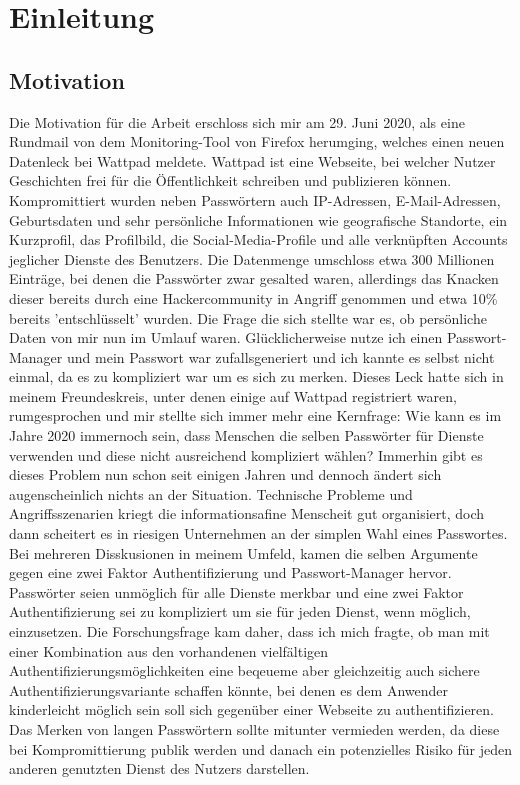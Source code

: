 \chapter{Einleitung}

\section{Motivation}
Die Motivation für die Arbeit erschloss sich mir am 29. Juni 2020, als eine Rundmail von dem Monitoring-Tool von Firefox herumging, welches einen neuen Datenleck bei Wattpad meldete. Wattpad ist eine Webseite, bei welcher Nutzer Geschichten frei für die Öffentlichkeit schreiben und publizieren können. Kompromittiert wurden neben Passwörtern auch IP-Adressen, E-Mail-Adressen, Geburtsdaten und sehr persönliche Informationen wie geografische Standorte, ein Kurzprofil, das Profilbild, die Social-Media-Profile und alle verknüpften Accounts jeglicher Dienste des Benutzers. Die Datenmenge umschloss etwa 300 Millionen Einträge, bei denen die Passwörter zwar gesalted waren, allerdings das Knacken dieser bereits durch eine Hackercommunity in Angriff genommen und etwa 10\% bereits 'entschlüsselt' wurden. Die Frage die sich stellte war es, ob persönliche Daten von mir nun im Umlauf waren. Glücklicherweise nutze ich einen Passwort-Manager und mein Passwort war zufallsgeneriert und ich kannte es selbst nicht einmal, da es zu kompliziert war um es sich zu merken. Dieses Leck hatte sich in meinem Freundeskreis, unter denen einige auf Wattpad registriert waren, rumgesprochen und mir stellte sich immer mehr eine Kernfrage: Wie kann es im Jahre 2020 immernoch sein, dass Menschen die selben Passwörter für Dienste verwenden und diese nicht ausreichend kompliziert wählen? Immerhin gibt es dieses Problem nun schon seit einigen Jahren und dennoch ändert sich augenscheinlich nichts an der Situation. Technische Probleme und Angriffsszenarien kriegt die informationsafine Menscheit gut organisiert, doch dann scheitert es in riesigen Unternehmen an der simplen Wahl eines Passwortes. Bei mehreren Disskusionen in meinem Umfeld, kamen die selben Argumente gegen eine zwei Faktor Authentifizierung und Passwort-Manager hervor. Passwörter seien unmöglich für alle Dienste merkbar und eine zwei Faktor Authentifizierung sei zu kompliziert um sie für jeden Dienst, wenn möglich, einzusetzen. Die Forschungsfrage kam daher, dass ich mich fragte, ob man mit einer Kombination aus den vorhandenen vielfältigen Authentifizierungsmöglichkeiten eine beqeueme aber gleichzeitig auch sichere Authentifizierungsvariante schaffen könnte, bei denen es dem Anwender kinderleicht möglich sein soll sich gegenüber einer Webseite zu authentifizieren. Das Merken von langen Passwörtern sollte mitunter vermieden werden, da diese bei Kompromittierung publik werden und danach ein potenzielles Risiko für jeden anderen genutzten Dienst des Nutzers darstellen.

